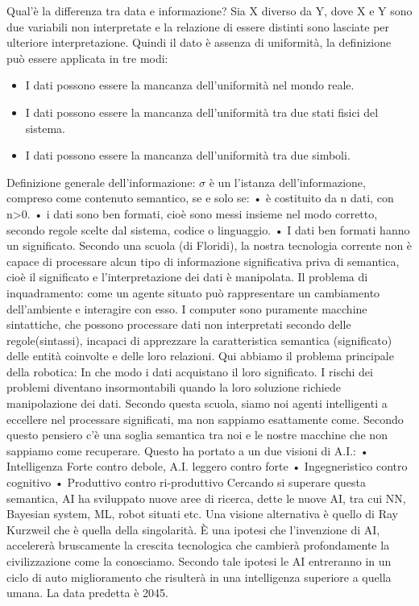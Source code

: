 \documentclass[11pt, a4page, twocolumn]{article}
\begin{document}
Qual’è la differenza tra data e informazione? Sia X diverso da Y, dove X e Y sono due variabili non interpretate e la relazione di essere distinti sono lasciate per ulteriore interpretazione. Quindi il dato è assenza di uniformità, la definizione può essere applicata in tre modi:
\begin{itemize}
    \item I dati possono essere la mancanza dell’uniformità nel mondo reale.
    \item I dati possono essere la mancanza dell’uniformità tra due stati fisici del sistema.
    \item I dati possono essere la mancanza dell’uniformità  tra due simboli.
\end{itemize}
Definizione generale dell’informazione: $\sigma$ è un l’istanza dell’informazione, compreso come contenuto semantico, se e solo se:
    • è costituito da n dati, con n>0.
    • i dati sono ben formati, cioè sono messi insieme nel modo corretto, secondo regole scelte dal sistema, codice o linguaggio.
    • I dati ben formati hanno un significato.
Secondo una scuola (di Floridi), la nostra tecnologia corrente non è capace di processare alcun tipo di informazione significativa priva di semantica, cioè il significato e l’interpretazione dei dati è manipolata. 
Il problema di inquadramento: come un agente situato può rappresentare un cambiamento dell’ambiente e interagire con esso. I computer sono puramente macchine sintattiche, che possono processare dati non interpretati secondo delle regole(sintassi), incapaci di apprezzare la caratteristica semantica (significato) delle entità coinvolte e delle loro relazioni.
Qui abbiamo il problema principale della robotica: In che modo i dati acquistano il loro significato.
I rischi dei problemi diventano insormontabili quando la loro soluzione richiede manipolazione dei dati. Secondo questa scuola, siamo noi agenti intelligenti a eccellere nel processare significati, ma non sappiamo esattamente come. Secondo questo pensiero c’è una soglia semantica tra noi e le nostre macchine che non sappiamo come recuperare.
Questo ha portato a un due visioni di A.I.:
    • Intelligenza Forte contro debole, A.I. leggero contro forte
    • Ingegneristico contro cognitivo
    • Produttivo contro ri-produttivo
Cercando si superare questa semantica, AI ha sviluppato nuove aree di ricerca, dette le nuove AI, tra cui NN, Bayesian system, ML, robot situati etc. 
Una visione alternativa è quello di Ray Kurzweil che è quella della singolarità. È una ipotesi che l’invenzione di AI, accelererà bruscamente la crescita tecnologica che cambierà profondamente la civilizzazione come la conosciamo. Secondo tale ipotesi le AI entreranno in un ciclo di auto miglioramento che risulterà in una intelligenza superiore a quella umana. La data predetta è 2045.
\end{document}
